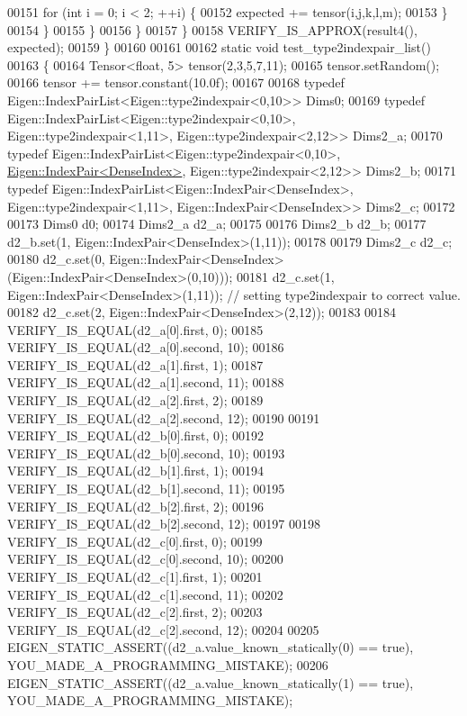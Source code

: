 \begin{DoxyCode}
00151           \textcolor{keywordflow}{for} (\textcolor{keywordtype}{int} i = 0; i < 2; ++i) \{
00152             expected += tensor(i,j,k,l,m);
00153           \}
00154         \}
00155       \}
00156     \}
00157   \}
00158   VERIFY\_IS\_APPROX(result4(), expected);
00159 \}
00160 
00161 
00162 \textcolor{keyword}{static} \textcolor{keywordtype}{void} test\_type2indexpair\_list()
00163 \{
00164   Tensor<float, 5> tensor(2,3,5,7,11);
00165   tensor.setRandom();
00166   tensor += tensor.constant(10.0f);
00167 
00168   \textcolor{keyword}{typedef} Eigen::IndexPairList<Eigen::type2indexpair<0,10>> Dims0;
00169   \textcolor{keyword}{typedef} Eigen::IndexPairList<Eigen::type2indexpair<0,10>, Eigen::type2indexpair<1,11>, 
      Eigen::type2indexpair<2,12>> Dims2\_a;
00170   \textcolor{keyword}{typedef} Eigen::IndexPairList<Eigen::type2indexpair<0,10>, 
      \hyperlink{struct_eigen_1_1_index_pair}{Eigen::IndexPair<DenseIndex>}, Eigen::type2indexpair<2,12>> Dims2\_b;
00171   \textcolor{keyword}{typedef} Eigen::IndexPairList<Eigen::IndexPair<DenseIndex>, Eigen::type2indexpair<1,11>, 
      Eigen::IndexPair<DenseIndex>> Dims2\_c;
00172 
00173   Dims0 d0;
00174   Dims2\_a d2\_a;
00175 
00176   Dims2\_b d2\_b;
00177   d2\_b.set(1, Eigen::IndexPair<DenseIndex>(1,11));
00178 
00179   Dims2\_c d2\_c;
00180   d2\_c.set(0, Eigen::IndexPair<DenseIndex>(Eigen::IndexPair<DenseIndex>(0,10)));
00181   d2\_c.set(1, Eigen::IndexPair<DenseIndex>(1,11));  \textcolor{comment}{// setting type2indexpair to correct value.}
00182   d2\_c.set(2, Eigen::IndexPair<DenseIndex>(2,12));
00183 
00184   VERIFY\_IS\_EQUAL(d2\_a[0].first, 0);
00185   VERIFY\_IS\_EQUAL(d2\_a[0].second, 10);
00186   VERIFY\_IS\_EQUAL(d2\_a[1].first, 1);
00187   VERIFY\_IS\_EQUAL(d2\_a[1].second, 11);
00188   VERIFY\_IS\_EQUAL(d2\_a[2].first, 2);
00189   VERIFY\_IS\_EQUAL(d2\_a[2].second, 12);
00190 
00191   VERIFY\_IS\_EQUAL(d2\_b[0].first, 0);
00192   VERIFY\_IS\_EQUAL(d2\_b[0].second, 10);
00193   VERIFY\_IS\_EQUAL(d2\_b[1].first, 1);
00194   VERIFY\_IS\_EQUAL(d2\_b[1].second, 11);
00195   VERIFY\_IS\_EQUAL(d2\_b[2].first, 2);
00196   VERIFY\_IS\_EQUAL(d2\_b[2].second, 12);
00197 
00198   VERIFY\_IS\_EQUAL(d2\_c[0].first, 0);
00199   VERIFY\_IS\_EQUAL(d2\_c[0].second, 10);
00200   VERIFY\_IS\_EQUAL(d2\_c[1].first, 1);
00201   VERIFY\_IS\_EQUAL(d2\_c[1].second, 11);
00202   VERIFY\_IS\_EQUAL(d2\_c[2].first, 2);
00203   VERIFY\_IS\_EQUAL(d2\_c[2].second, 12);
00204 
00205   EIGEN\_STATIC\_ASSERT((d2\_a.value\_known\_statically(0) == \textcolor{keyword}{true}), YOU\_MADE\_A\_PROGRAMMING\_MISTAKE);
00206   EIGEN\_STATIC\_ASSERT((d2\_a.value\_known\_statically(1) == \textcolor{keyword}{true}), YOU\_MADE\_A\_PROGRAMMING\_MISTAKE);

\end{DoxyCode}
